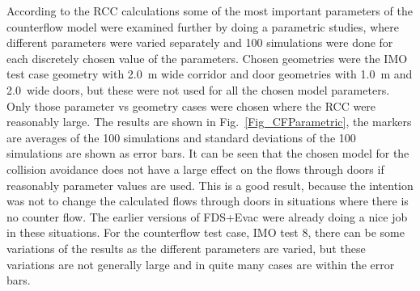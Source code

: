 \documentclass[12pt,a4paper,final,twoside]{stylevk}
\begin{document}
According to the RCC calculations some of the most important
parameters of the counterflow model were examined further by doing a
parametric studies, where different parameters were varied separately
and 100 simulations were done for each discretely chosen value of the
parameters.  Chosen geometries were the IMO test case geometry with
2.0~m wide corridor and door geometries with 1.0~m and 2.0~wide doors,
but these were not used for all the chosen model parameters.  Only
those parameter vs geometry cases were chosen where the RCC were
reasonably large.  The results are shown in
Fig.~\ref{Fig_CFParametric}, the markers are averages of the 100
simulations and standard deviations of the 100 simulations are shown
as error bars.  It can be seen that the chosen model for the collision
avoidance does not have a large effect on the flows through doors if
reasonably parameter values are used.  This is a good result, because
the intention was not to change the calculated flows through doors in
situations where there is no counter flow.  The earlier versions of
FDS+Evac were already doing a nice job in these situations.  For the
counterflow test case, IMO test 8, there can be some variations of the
results as the different parameters are varied, but these variations
are not generally large and in quite many cases are within the error
bars.
\end{document}
